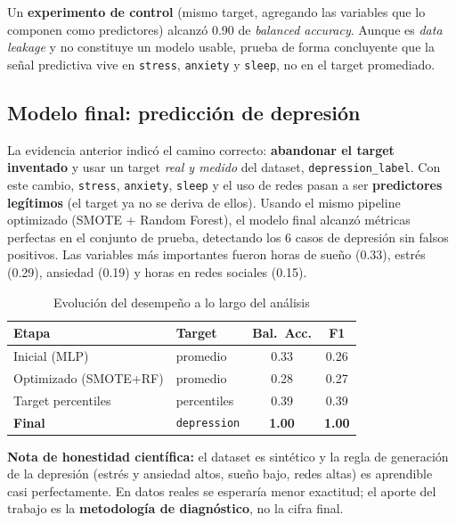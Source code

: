 \documentclass[11pt,twocolumn]{article}
\begin{document}
Un \textbf{experimento de control} (mismo target, agregando las variables que
lo componen como predictores) alcanz\'o 0.90 de \textit{balanced accuracy}.
Aunque es \textit{data leakage} y no constituye un modelo usable, prueba de
forma concluyente que la se\~nal predictiva vive en \texttt{stress},
\texttt{anxiety} y \texttt{sleep}, no en el target promediado.

\subsection{Modelo final: predicci\'on de depresi\'on}

La evidencia anterior indic\'o el camino correcto: \textbf{abandonar el target
inventado} y usar un target \emph{real y medido} del dataset,
\texttt{depression\_label}. Con este cambio, \texttt{stress}, \texttt{anxiety},
\texttt{sleep} y el uso de redes pasan a ser \textbf{predictores leg\'itimos}
(el target ya no se deriva de ellos). Usando el mismo pipeline optimizado
(SMOTE + Random Forest), el modelo final alcanz\'o m\'etricas perfectas en el
conjunto de prueba, detectando los 6 casos de depresi\'on sin falsos
positivos. Las variables m\'as importantes fueron horas de sue\~no (0.33),
estr\'es (0.29), ansiedad (0.19) y horas en redes sociales (0.15).

\begin{table}[H]
\centering
\caption{Evoluci\'on del desempe\~no a lo largo del an\'alisis}
\label{tab:journey}
\small
\begin{tabular}{llcc}
\toprule
\textbf{Etapa} & \textbf{Target} & \textbf{Bal.\ Acc.} & \textbf{F1} \\
\midrule
\rowcolor{lightrow} Inicial (MLP)   & promedio   & 0.33 & 0.26 \\
Optimizado (SMOTE+RF)               & promedio   & 0.28 & 0.27 \\
\rowcolor{lightrow} Target percentiles & percentiles & 0.39 & 0.39 \\
\textbf{Final}                      & \texttt{depression} & \textbf{1.00} & \textbf{1.00} \\
\bottomrule
\end{tabular}
\end{table}

\textbf{Nota de honestidad cient\'ifica:} el dataset es sint\'etico y la regla
de generaci\'on de la depresi\'on (estr\'es y ansiedad altos, sue\~no bajo,
redes altas) es aprendible casi perfectamente. En datos reales se esperar\'ia
menor exactitud; el aporte del trabajo es la \textbf{metodolog\'ia de
diagn\'ostico}, no la cifra final.
\end{document}
